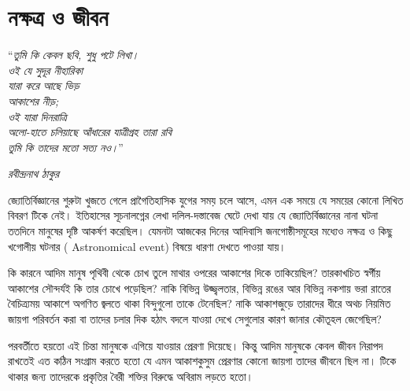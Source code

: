 \chapter{নক্ষত্র ও জীবন }\label{ch:1}

\epigraph{``\textit{তুমি কি কেবল ছবি, শুধু পটে লিখা।\\
ওই যে সুদূর নীহারিকা\\
যারা করে আছে ভিড়\\
আকাশের নীড়; \\
ওই যারা দিনরাত্রি \\
অলো-হাতে চলিয়াছে আঁধারের যাত্রীগ্রহ তারা রবি\\
তুমি কি তাদের মতো সত্য নও।}''}{\textit{রবীন্দ্রনাথ ঠাকুর}}



জ্যোতির্বিজ্ঞানের শুরুটা খুজতে গেলে প্রাগৈতিহাসিক যুগের সময় চলে আসে, এমন এক সময়ে যে সময়ের কোনো লিখিত বিবরণ টিকে নেই। ইতিহাসের সূচনালগ্নের লেখা দলিল-দস্তাবেজ ঘেটে দেখা যায় যে জ্যোতির্বিজ্ঞানের নানা ঘটনা ততদিনে মানুষের দৃষ্টি আকর্ষণ করেছিল। যেমনটা আজকের দিনের আদিবাসি জনগোষ্ঠীসমূহের মধ্যেও নক্ষত্র ও  কিছু খগোলীয় ঘটনার ( Astronomical event) বিষয়ে ধারণা দেখতে পাওয়া যায়।



কি কারনে আদিম মানুষ পৃথিবী থেকে চোখ তুলে মাথার ওপরের আকাশের দিকে তাকিয়েছিল? তারকাখচিত স্বর্গীয় আকাশের সৌন্দর্যই কি তার চোখে পড়েছিল? নাকি বিভিন্ন উজ্জ্বলতার, বিভিন্ন রঙের আর বিভিন্ন নকশায় ভরা রাতের বৈচিত্র্যময় আকাশে অগণিত জ্বলতে থাকা বিন্দুগুলো তাকে টেনেছিল? নাকি আকাশজুড়ে তারাদের ধীরে অথচ নিয়মিত জায়গা পরিবর্তন করা বা তাদের চলার দিক হঠাৎ বদলে যাওয়া দেখে সেগুলোর কারণ জানার কৌতূহল জেগেছিল?

পরবর্তীতে হয়তো এই চিন্তা মানুষকে এগিয়ে যাওয়ার প্রেরণা দিয়েছে। কিন্তু আদিম মানুষকে কেবল জীবন নিরাপদ রাখতেই এত কঠিন সংগ্রাম করতে হতো যে এমন আকাশকুসুম প্রেরণার কোনো জায়গা তাদের জীবনে ছিল না। টিকে থাকার জন্য তাদেরকে প্রকৃতির বৈরী শক্তির বিরুদ্ধে অবিরাম লড়তে হতো।

